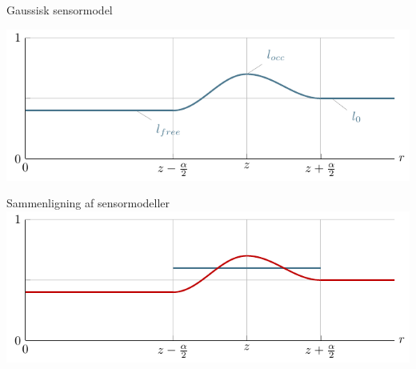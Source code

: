 \begin{frame}{Gaussisk sensormodel}

\includegraphics{gaussian_sensormodel.pdf}
\end{frame}

\begin{frame}{Sammenligning af sensormodeller}
\includegraphics{combined_sensormodel}
\end{frame}

